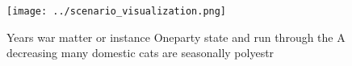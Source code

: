 \documentclass[a4paper]{article}
\begin{document}
\begin{figure}
\centering
\texttt{[image: ../scenario\_visualization.png]}
\caption{Years war matter or instance Oneparty state and run through the A decreasing many domestic cats are seasonally polyestr
}
\end{figure}
 
\end{document}
